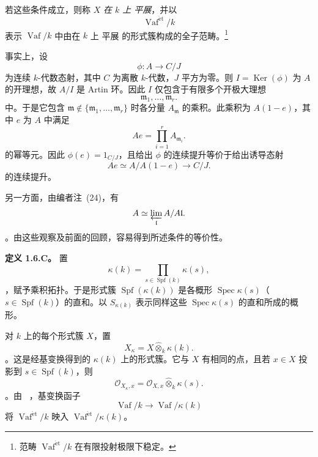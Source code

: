 若这些条件成立，则称 \(X\) \emph{在 \(k\) 上 平展}，并以 \[
  \operatorname{Vaf}^{\mathrm{\acute{e}t}}/k
\] 表示 \(\operatorname{Vaf}/k\) 中由在 \(k\) 上 平展 的形式簇构成的全子范畴。\footnote{\label{sga3:VIIB:nde:72}范畴 \(\operatorname{Vaf}^{\mathrm{\acute{e}t}}/k\) 在有限投射极限下稳定。}

事实上，设 \[
  \phi:A\longrightarrow C/J
\] 为连续 \(k\)-代数态射，其中 \(C\) 为离散 \(k\)-代数，\(J\) 平方为零。则 \(I=\operatorname{Ker}(\phi)\) 为 \(A\) 的开理想，故 \(A/I\) 是 Artin 环。因此 \(I\) 仅包含于有限多个开极大理想 \[
  \mathfrak m_1,\ldots,\mathfrak m_r.
\] 中。于是它包含 \(\mathfrak m\notin\{\mathfrak m_1,\ldots,\mathfrak m_r\}\) 时各分量 \(A_{\mathfrak m}\) 的乘积。此乘积为 \(A(1-e)\)，其中 \(e\) 为 \(A\) 中满足 \[
  Ae=\prod_{i=1}^{r}A_{\mathfrak m_i}.
\] 的幂等元。因此 \(\phi(e)=1_{C/J}\)，且给出 \(\phi\) 的连续提升等价于给出诱导态射 \[
  Ae\simeq A/A(1-e)\longrightarrow C/J.
\] 的连续提升。

另一方面，由编者注~(24)，有 \[
  A\simeq\varprojlim_{\mathfrak l}A/A\mathfrak l.
\]。由这些观察及前面的回顾，容易得到所述条件的等价性。

\medskip\noindent\textbf{定义 1.6.C。} \label{sga3:VIIB:1.6.C} 置 \[
  \kappa(k)
  =
  \prod_{s\in\operatorname{Spf}(k)}\kappa(s),
\]，赋予乘积拓扑。于是形式簇 \(\operatorname{Spf}(\kappa(k))\) 是各概形 \(\operatorname{Spec}\kappa(s)\)（\(s\in\operatorname{Spf}(k)\)）的直和。以 \(S_{\kappa(k)}\) 表示同样这些 \(\operatorname{Spec}\kappa(s)\) 的直和所成的概形。

对 \(k\) 上的每个形式簇 \(X\)，置 \[
  X_\kappa
  =
  X\widehat\otimes_k\kappa(k).
\]。这是经基变换得到的 \(\kappa(k)\) 上的形式簇。它与 \(X\) 有相同的点，且若 \(x\in X\) 投影到 \(s\in\operatorname{Spf}(k)\)，则 \[
  \mathcal O_{X_\kappa,x}
  =
  \mathcal O_{X,x}\widehat\otimes_k\kappa(s).
\]。由 ~，基变换函子 \[
  \operatorname{Vaf}/k
  \longrightarrow
  \operatorname{Vaf}/\kappa(k)
\] 将 \(\operatorname{Vaf}^{\mathrm{\acute{e}t}}/k\) 映入 \(\operatorname{Vaf}^{\mathrm{\acute{e}t}}/\kappa(k)\)。
